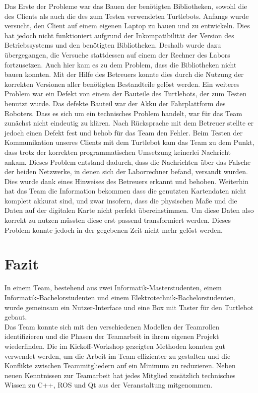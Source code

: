 \documentclass[a4paper,12pt,headsepline]{scrartcl}
\begin{document}
Das Erste der Probleme war das Bauen der benötigten Bibliotheken, sowohl die des Clients als auch die des zum Testen verwendeten Turtlebots. Anfangs wurde versucht, den Client auf einem eigenen Laptop zu bauen und zu entwickeln. Dies hat jedoch nicht funktioniert aufgrund der Inkompatibilität der Version des Betriebssystems und den benötigten Bibliotheken. Deshalb wurde dazu übergegangen, die Versuche stattdessen auf einem der Rechner des Labors fortzusetzen. Auch hier kam es zu dem Problem, dass die Bibliotheken nicht bauen konnten. Mit der Hilfe des Betreuers konnte dies durch die Nutzung der korrekten Versionen aller benötigten Bestandteile gelöst werden. Ein weiteres Problem war ein Defekt von einem der Bauteile des Turtlebots, der zum Testen benutzt wurde. Das defekte Bauteil war der Akku der Fahrplattform des Roboters. Dass es sich um ein technisches Problem handelt, war für das Team zunächst nicht eindeutig zu klären. Nach Rücksprache mit dem Betreuer stellte er jedoch einen Defekt fest und behob für das Team den Fehler. Beim Testen der Kommunikation unseres Clients mit dem Turtlebot kam das Team zu dem Punkt, dass trotz der korrekten programmatischen Umsetzung keinerlei Nachricht ankam. Dieses Problem entstand dadurch, dass die Nachrichten über das Falsche der beiden Netzwerke, in denen sich der Laborrechner befand, versandt wurden. Dies wurde dank eines Hinweises des Betreuers erkannt und behoben.
Weiterhin hat das Team die Information bekommen dass die genutzten Kartendaten nicht komplett akkurat sind, und zwar insofern, dass die physischen Maße und die Daten auf der digitalen Karte nicht perfekt übereinstimmen. Um diese Daten also korrekt zu nutzen müssten diese erst passend transformiert werden. Dieses Problem konnte jedoch in der gegebenen Zeit nicht mehr gelöst werden.

\newpage
	\section{Fazit}
		In einem Team, bestehend aus zwei Informatik-Masterstudenten, einem Informatik-Bachelorstudenten und einem Elektrotechnik-Bachelorstudenten, wurde gemeinsam ein Nutzer-Interface und eine Box mit Taster für den Turtlebot gebaut.\\
		Das Team konnte sich mit den verschiedenen Modellen der Teamrollen identifizieren und die Phasen der Teamarbeit in ihrem eigenen Projekt wiederfinden. Die im Kickoff-Workshop gezeigten Methoden konnten gut verwendet werden, um die Arbeit im Team effizienter zu gestalten und die Konflikte zwischen Teammitgliedern auf ein Minimum zu reduzieren. Neben neuen Kenntnissen zur Teamarbeit hat jedes Mitglied zusätzlich technisches Wissen zu C++, ROS und Qt aus der Veranstaltung mitgenommen.
		
\end{document}
